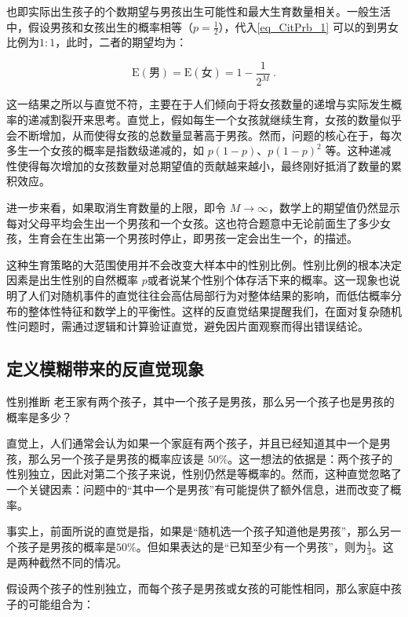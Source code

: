 也即实际出生孩子的个数期望与男孩出生可能性和最大生育数量相关。一般生活中，假设男孩和女孩出生的概率相等（$\displaystyle p = \frac{1}{2}$），代入\autoref{eq_CitPrb_1} 可以的到男女比例为$1:1$，此时，二者的期望均为：

\begin{equation}
\text{E}(\text{男})=\text{E}(\text{女})=1-\frac{1}{2^M}~.
\end{equation}

这一结果之所以与直觉不符，主要在于人们倾向于将女孩数量的递增与实际发生概率的递减割裂开来思考。直觉上，假如每生一个女孩就继续生育，女孩的数量似乎会不断增加，从而使得女孩的总数量显著高于男孩。然而，问题的核心在于，每次多生一个女孩的概率是指数级递减的，如 $p(1-p)$、$p(1-p)^2$ 等。这种递减性使得每次增加的女孩数量对总期望值的贡献越来越小，最终刚好抵消了数量的累积效应。

进一步来看，如果取消生育数量的上限，即令 $M \to \infty$，数学上的期望值仍然显示每对父母平均会生出一个男孩和一个女孩。这也符合题意中无论前面生了多少女孩，生育会在生出第一个男孩时停止，即男孩一定会出生一个，的描述。

这种生育策略的大范围使用并不会改变大样本中的性别比例。性别比例的根本决定因素是出生性别的自然概率 $p$或者说某个性别个体存活下来的概率。这一现象也说明了人们对随机事件的直觉往往会高估局部行为对整体结果的影响，而低估概率分布的整体性特征和数学上的平衡性。这样的反直觉结果提醒我们，在面对复杂随机性问题时，需通过逻辑和计算验证直觉，避免因片面观察而得出错误结论。


\subsection{定义模糊带来的反直觉现象}

\begin{example}{性别推断}
老王家有两个孩子，其中一个孩子是男孩，那么另一个孩子也是男孩的概率是多少？
\end{example}

直觉上，人们通常会认为如果一个家庭有两个孩子，并且已经知道其中一个是男孩，那么另一个孩子是男孩的概率应该是 $50\%$。这一想法的依据是：两个孩子的性别独立，因此对第二个孩子来说，性别仍然是等概率的。然而，这种直觉忽略了一个关键因素：问题中的“其中一个是男孩”有可能提供了额外信息，进而改变了概率。

事实上，前面所说的直觉是指，如果是“随机选一个孩子知道他是男孩”，那么另一个孩子是男孩的概率是$50\%$。但如果表达的是“已知至少有一个男孩”，则为$\displaystyle \frac{1}{3}$。这是两种截然不同的情况。

假设两个孩子的性别独立，而每个孩子是男孩或女孩的可能性相同，那么家庭中孩子的可能组合为：

